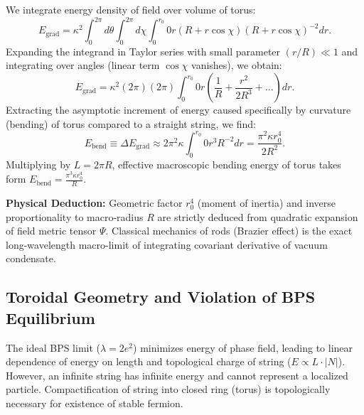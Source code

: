 \documentclass[12pt,a4paper]{article}
\begin{document}
We integrate energy density of field over volume of torus:
\begin{equation}
    E_{\text{grad}} = \kappa^2 \int_0^{2\pi} d\theta \int_0^{2\pi} d\chi \int_0^{r_0} 0 r(R+r\cos\chi) (R+r\cos\chi)^{-2} dr.
    \label{eq:grad_energy_integral}
\end{equation}
Expanding the integrand in Taylor series with small parameter $(r/R) \ll 1$ and integrating over angles (linear term $\cos\chi$ vanishes), we obtain:
\begin{equation}
    E_{\text{grad}} = \kappa^2 (2\pi)(2\pi) \int_0^{r_0} 0 r \left( \frac{1}{R} + \frac{r^2}{2R^3} + \dots \right) dr.
    \label{eq:grad_expansion}
\end{equation}
Extracting the asymptotic increment of energy caused specifically by curvature (bending) of torus compared to a straight string, we find:
\begin{equation}
    E_{\text{bend}} \equiv \Delta E_{\text{grad}} \approx 2\pi^2 \kappa \int_0^{r_0} 0 r^3 R^{-2} dr = \frac{\pi^2 \kappa r_0^4}{2R^2}.
    \label{eq:bending_energy_approx}
\end{equation}
Multiplying by $L=2\pi R$, effective macroscopic bending energy of torus takes form $E_{\text{bend}} = \frac{\pi^3 \kappa r_0^4}{R}$.

\textbf{Physical Deduction:} Geometric factor $r_0^4$ (moment of inertia) and inverse proportionality to macro-radius $R$ are strictly deduced from quadratic expansion of field metric tensor $\Psi$. Classical mechanics of rods (Brazier effect) is the exact long-wavelength macro-limit of integrating covariant derivative of vacuum condensate.

\subsection{Toroidal Geometry and Violation of BPS Equilibrium}
The ideal BPS limit ($\lambda = 2e^2$) minimizes energy of phase field, leading to linear dependence of energy on length and topological charge of string ($E \propto L \cdot |N|$). However, an infinite string has infinite energy and cannot represent a localized particle. Compactification of string into closed ring (torus) is topologically necessary for existence of stable fermion.
\end{document}
